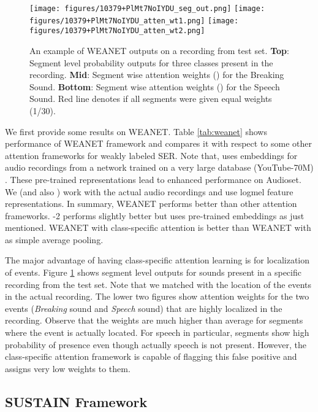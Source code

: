 \documentclass{article}
\begin{document}
\begin{figure}[t]
      \centering
      \texttt{[image: figures/10379+PlMt7NoIYDU\_seg\_out.png]}
      \texttt{[image: figures/10379+PlMt7NoIYDU\_atten\_wt1.png]}
      \texttt{[image: figures/10379+PlMt7NoIYDU\_atten\_wt2.png]}
    \caption{An example of WEANET outputs on a recording from test set. \textbf{Top}: Segment level probability outputs for three classes present in the recording. \textbf{Mid}: Segment wise attention weights () for the Breaking Sound. \textbf{Bottom}: Segment wise attention weights () for the Speech Sound. Red line denotes if all segments were given equal weights (1/30).}
    \label{fig:example_out}
\end{figure}

We first provide some results on WEANET. 
Table \ref{tab:weanet} shows performance of WEANET framework and compares it with respect to some other attention frameworks for weakly labeled SER. 
Note that, \cite{kong2019weakly} uses embeddings for audio recordings from a network trained on a very large database (YouTube-70M) \cite{hershey2017cnn}. 
These pre-trained representations lead to enhanced performance on Audioset. 
We (and also \cite{wang2018comparing}) work with the actual audio recordings and use logmel feature representations.  
In summary, WEANET performs better than other attention frameworks. 
\cite{kong2019weakly}-2 performs slightly better but uses pre-trained embeddings as just mentioned. 
WEANET with class-specific attention is  better than WEANET with  as simple average pooling. 

The major advantage of having class-specific attention learning is for localization of events. 
Figure \ref{fig:example_out} shows segment level outputs for  sounds present in a specific recording from the test set. 
Note that we matched with the location of the events in the actual recording. 
The lower two figures show attention weights for the two events (\emph{Breaking} sound and \emph{Speech} sound) that are highly localized in the recording. 
Observe that the weights are much higher than average for segments where the event is actually located. 
For speech in particular, segments  show high probability of presence even though actually speech is not present. 
However, the class-specific attention framework is capable of flagging this false positive and assigns very low weights to them.   

\subsection{SUSTAIN Framework} \label{sec:sustain-eval}
\end{document}
